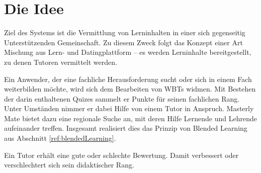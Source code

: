 \section{Die Idee}
Ziel des Systems ist die Vermittlung von Lerninhalten in einer sich gegenseitig
Unterstützenden Gemeinschaft. Zu diesem Zweck folgt das Konzept einer Art
Mischung aus Lern- und Datingplattform -- es werden Lerninhalte bereitgestellt,
zu denen Tutoren vermittelt werden.

Ein Anwender, der eine fachliche Herausforderung sucht oder sich in einem Fach
weiterbilden möchte, wird sich dem Bearbeiten von WBTs widmen. Mit Bestehen der
darin enthaltenen Quizes sammelt er Punkte für seinen fachlichen Rang. Unter
Umständen nimmer er dabei Hilfe von einem Tutor in Anspruch. Masterly Mate
bietet dazu eine regionale Suche an, mit deren Hilfe Lernende und Lehrende
aufeinander treffen. Insgesamt realisiert dies das Prinzip von Blended Learning
aus Abschnitt \ref{ref:blendedLearning}.

Ein Tutor erhält eine gute oder schlechte Bewertung. Damit verbessert oder
verschlechtert sich sein didaktischer Rang.
